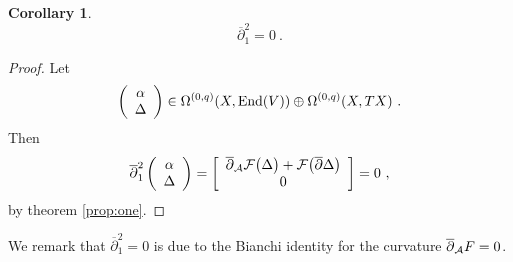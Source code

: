 \documentclass[12pt,a4paper]{article}
\def\bar#1{\overline{#1}}
\def\bp{\bar{\partial}}
\newtheorem{Cor}{Corollary}
\theoremstyle{definition}
\begin{document}
\begin{Cor}\label{prop:two}
\[\bp_1^2 = 0~.\]
\end{Cor}
\begin{proof}
Let
\begin{equation*}
\left(
\begin{array}{c}
\alpha\\ \Delta
\end{array}\right)
\in \Omega^{(0,q)}(X,{\rm End}(V)) \oplus \Omega^{(0,q)}(X, TX)~.
\end{equation*}
Then 
\begin{equation*}
\bp_1^2 
\left(
\begin{array}{c}
\alpha\\ \Delta
\end{array}\right) =
\left[ 
\begin{array}{c}
\bp_{\cal A}{\cal F}\big(\Delta\big) +  {\cal F}\big(\bp\Delta\big) \\
0    \end{array} 
\right] = 0~,
\end{equation*}
by theorem \ref{prop:one}.
\end{proof}
\vskip10pt
\noindent We remark that $\bp_1^2=0$ is due to the Bianchi identity for the curvature $\bp_{\cal A} F =  0$. 
\end{document}
